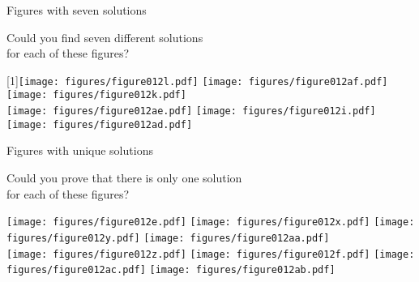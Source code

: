 \documentclass[14pt]{beamer}
\begin{document}
    \begin{frame}{Figures with seven solutions}

        \vspace{-1em}
        \begin{center}
            Could you find seven different solutions\\for each of these figures?

            \bigskip\bigskip

            \scalebox{-1}[1]{\texttt{[image: figures/figure012l.pdf]}}\qquad
            \texttt{[image: figures/figure012af.pdf]}\qquad
            \texttt{[image: figures/figure012k.pdf]}\quad\;\;\phantom{.}\\[4ex]
            \texttt{[image: figures/figure012ae.pdf]}\quad\qquad
            \texttt{[image: figures/figure012i.pdf]}\qquad\quad
            \texttt{[image: figures/figure012ad.pdf]}\\
        \end{center}
    \end{frame}


    \begin{frame}{Figures with unique solutions}

        \vspace{-1em}
        \begin{center}
            Could you prove that there is only one solution\\for each of these figures?

            \bigskip\bigskip

            \texttt{[image: figures/figure012e.pdf]}\quad
            \texttt{[image: figures/figure012x.pdf]}\quad
            \texttt{[image: figures/figure012y.pdf]}\!\!\!\!\!\!\!\!
            \texttt{[image: figures/figure012aa.pdf]}  \\[4ex]\quad
            \texttt{[image: figures/figure012z.pdf]}\qquad
            \texttt{[image: figures/figure012f.pdf]}\quad\;\;\;
            \texttt{[image: figures/figure012ac.pdf]}\quad
            \texttt{[image: figures/figure012ab.pdf]}\;\;\; \\
        \end{center}
    \end{frame}
\end{document}
